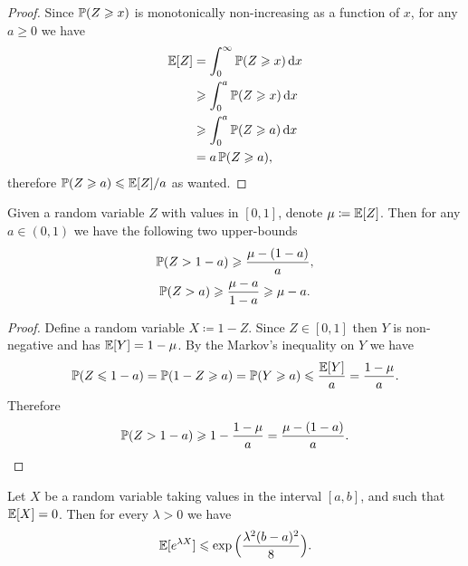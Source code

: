 \begin{proof}
Since \(\operatorname{\mathbb{P}}(Z \geqslant x)\) is monotonically non-increasing as a function of
\(x\), for any \(a \geq 0\) we have
\begin{align*}
  \operatorname{\mathbb{E}}[Z]
  &= \int_0^{\infty} \operatorname{\mathbb{P}}(Z \geqslant x)\, \mathrm{d} x \\
  &\geqslant \int_0^a \operatorname{\mathbb{P}}(Z \geqslant x)\, \mathrm{d} x \\
  &\geqslant \int_0^a \operatorname{\mathbb{P}}(Z \geqslant a)\, \mathrm{d} x \\
  &= a \operatorname{\mathbb{P}}(Z \geqslant a),
\end{align*}
therefore \(\operatorname{\mathbb{P}}(Z \geqslant a) \leqslant \operatorname{\mathbb{E}}[Z] / a\) as wanted.
\end{proof}

\begin{lemma}
\label{lem:markov-inequality-lemma}
Given a random variable \(Z\) with values in \([0, 1]\), denote \(\mu \coloneq
\operatorname{\mathbb{E}}[Z]\). Then for any \(a \in (0, 1)\) we have the following two upper-bounds
\begin{gather}
  \operatorname{\mathbb{P}}(Z > 1 - a) \geqslant \frac{\mu - (1 - a)}{a}, \\
  \operatorname{\mathbb{P}}(Z > a) \geqslant \frac{\mu - a}{1 - a} \geqslant \mu - a.
\end{gather}
\end{lemma}

\begin{proof}
Define a random variable \(X \coloneq 1 - Z\). Since \(Z \in [0, 1]\) then \(Y\)
is non-negative and has \(\operatorname{\mathbb{E}}[Y] = 1 - \mu\). By the Markov's inequality on
\(Y\) we have
\[
\operatorname{\mathbb{P}}(Z \leqslant 1 - a)
= \operatorname{\mathbb{P}}(1 - Z \geqslant a)
= \operatorname{\mathbb{P}}(Y \geqslant a)
\leqslant \frac{\operatorname{\mathbb{E}}[Y]}{a}
= \frac{1 - \mu}{a}.
\]
Therefore
\[
\operatorname{\mathbb{P}}(Z > 1 - a) \geqslant 1 - \frac{1 - \mu}{a} = \frac{\mu - (1 - a)}{a}.
\]
\end{proof}

\begin{lemma}
\label{lem:hoeffding-lemma}
Let \(X\) be a random variable taking values in the interval \([a, b]\),
and such that \(\operatorname{\mathbb{E}}[X] = 0\). Then for every \(\lambda > 0\) we have
\[
\operatorname{\mathbb{E}}[e^{\lambda X}] \leqslant \exp\Big( \frac{\lambda^2 (b - a)^2}{8} \Big).
\]
\end{lemma}

